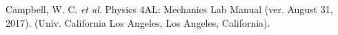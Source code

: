 \documentclass[twoside,twocolumn]{article}
\begin{document}

\begin{thebibliography}{99} %

Campbell, W. C. \textit{et al}. Physics 4AL: Mechanics Lab Manual (ver. August 31, 2017).
(Univ. California Los Angeles, Los Angeles, California).

\end{thebibliography}

\end{document}
